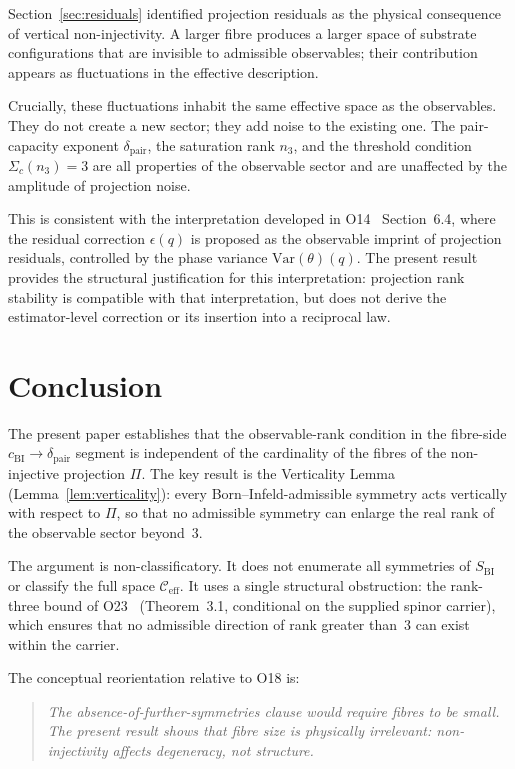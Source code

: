 \documentclass[11pt,a4paper]{article}
\newcommand{\dpair}{\delta_{\mathrm{pair}}}
\newcommand{\SBI}{S_{\mathrm{BI}}}
\newcommand{\cchi}{c_{\mathrm{BI}}}
\begin{document}
    Section~\ref{sec:residuals} identified projection residuals as the physical consequence of
    vertical non-injectivity.
    A larger fibre produces a larger space of substrate configurations that are invisible to
    admissible observables; their contribution appears as fluctuations in the effective
    description.

    Crucially, these fluctuations inhabit the same effective space as the observables.
    They do not create a new sector; they add noise to the existing one.
    The pair-capacity exponent $\dpair$, the saturation rank $n_3$, and the threshold condition
    $\Sigma_c(n_3) = 3$ are all properties of the observable sector and are unaffected by the
    amplitude of projection noise.

    This is consistent with the interpretation developed in O14~\cite{Beau2026a18} Section~6.4,
    where the residual correction $\epsilon(q)$ is proposed as the observable imprint of
    projection residuals, controlled by the phase variance $\mathrm{Var}(\theta)(q)$.
    The present result provides the structural justification for this interpretation: projection
    rank stability is compatible with that interpretation, but does not derive the estimator-level
    correction or its insertion into a reciprocal law.

  \section{Conclusion}
  \label{sec:conclusion}

  The present paper establishes that the observable-rank condition in the fibre-side
  $\cchi \to \dpair$ segment is independent of the cardinality of the fibres of the
  non-injective projection $\Pi$.
  The key result is the Verticality Lemma (Lemma~\ref{lem:verticality}): every Born--Infeld-admissible
  symmetry acts vertically with respect to $\Pi$, so that no admissible symmetry can enlarge
  the real rank of the observable sector beyond~$3$.

  The argument is non-classificatory.
  It does not enumerate all symmetries of $\SBI$ or classify the full space
  $\mathcal{C}_{\mathrm{eff}}$.
  It uses a single structural obstruction: the rank-three bound of
  O23~\cite{Beau2026a27} (Theorem~3.1, conditional on the supplied spinor carrier), which
  ensures that no admissible direction of rank greater than~$3$ can exist within the carrier.

  The conceptual reorientation relative to O18 is:
  \begin{quote}
    \emph{The absence-of-further-symmetries clause would require fibres to be small.
    The present result shows that fibre size is physically irrelevant:
    non-injectivity affects degeneracy, not structure.}
  \end{quote}
\end{document}
